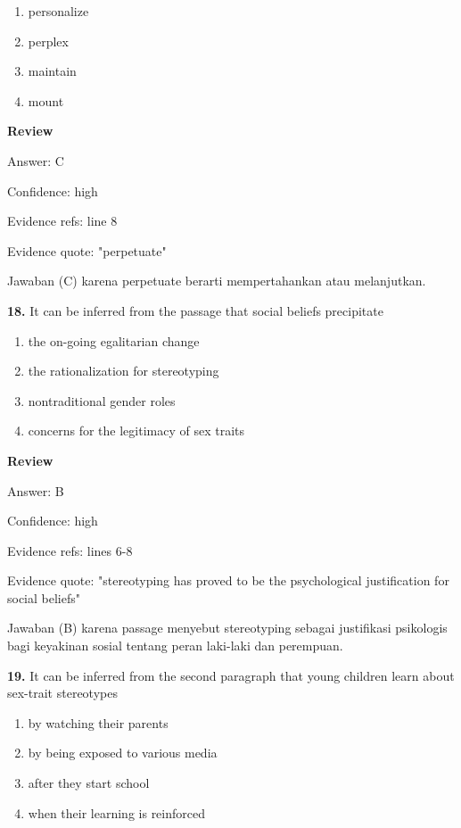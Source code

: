 \documentclass[12pt]{article}
\begin{document}
\begin{enumerate}[label=(\Alph*),leftmargin=*,itemsep=0.2em]
\item personalize
\item perplex
\item maintain
\item mount
\end{enumerate}
\par
\begingroup
\setlength{\parskip}{0pt}
\setlength{\parindent}{0pt}
\textbf{Review}\par
Answer: C\par
Confidence: high\par
Evidence refs: line 8\par
Evidence quote: "perpetuate"\par
Jawaban (C) karena perpetuate berarti mempertahankan atau melanjutkan.\par
\endgroup
\par
\vspace{0.25\baselineskip}
\noindent\textbf{18.} It can be inferred from the passage that social beliefs precipitate
\begin{enumerate}[label=(\Alph*),leftmargin=*,itemsep=0.2em]
\item the on-going egalitarian change
\item the rationalization for stereotyping
\item nontraditional gender roles
\item concerns for the legitimacy of sex traits
\end{enumerate}
\par
\begingroup
\setlength{\parskip}{0pt}
\setlength{\parindent}{0pt}
\textbf{Review}\par
Answer: B\par
Confidence: high\par
Evidence refs: lines 6-8\par
Evidence quote: "stereotyping has proved to be the psychological justification for social beliefs"\par
Jawaban (B) karena passage menyebut stereotyping sebagai justifikasi psikologis bagi keyakinan sosial tentang peran laki-laki dan perempuan.\par
\endgroup
\par
\vspace{0.25\baselineskip}
\noindent\textbf{19.} It can be inferred from the second paragraph that young children learn about sex-trait stereotypes
\begin{enumerate}[label=(\Alph*),leftmargin=*,itemsep=0.2em]
\item by watching their parents
\item by being exposed to various media
\item after they start school
\item when their learning is reinforced
\end{enumerate}
\end{document}
